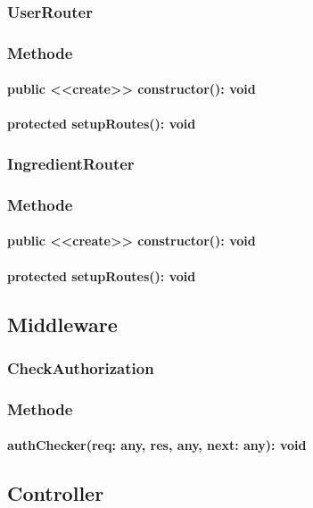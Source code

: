 \documentclass[parskip=full]{scrartcl}
\begin{document}
\subsubsection{UserRouter}
\subsubsection*{Methode}
\paragraph{public <<create>> constructor(): void}
\paragraph{protected setupRoutes(): void}

\subsubsection{IngredientRouter}
\subsubsection*{Methode}
\paragraph{public <<create>> constructor(): void}
\paragraph{protected setupRoutes(): void}

\subsection{Middleware}
\subsubsection{CheckAuthorization}
\subsubsection*{Methode}
\paragraph{authChecker(req: any, res, any, next: any): void}

\subsection{Controller}
\end{document}
